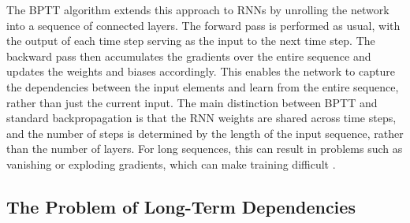 \documentclass{article}
\begin{document}
The BPTT algorithm extends this approach to RNNs by unrolling the network into a
sequence of connected layers. The forward pass is performed as usual, with the output of
each time step serving as the input to the next time step. The backward pass then
accumulates the gradients over the entire sequence and updates the weights and biases
accordingly. This enables the network to capture the dependencies between the input
elements and learn from the entire sequence, rather than just the current input. The
main distinction between BPTT and standard backpropagation is that the RNN weights are
shared across time steps, and the number of steps is determined by the length of the
input sequence, rather than the number of layers. For long sequences, this can result in
problems such as vanishing or exploding gradients, which can make training difficult
\cite{Bengio1994}.


\subsection{The Problem of Long-Term Dependencies}
\label{sec:2.3}
\end{document}
